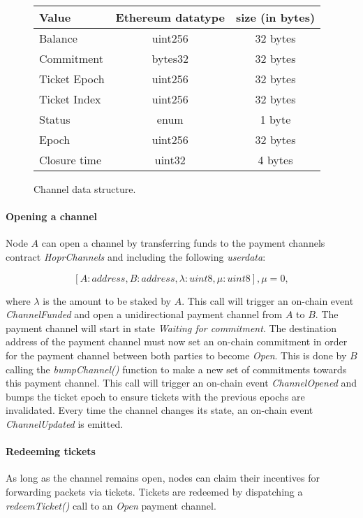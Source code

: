 \begin{figure}[H]
    \centering
    \begin{tabular}{| l | c | c |}
        \hline
        Value        & Ethereum datatype & size (in bytes) \\
        \hline
        \hline
        Balance      & uint256           & 32 bytes        \\
        Commitment   & bytes32           & 32 bytes        \\
        Ticket Epoch & uint256           & 32 bytes        \\
        Ticket Index & uint256           & 32 bytes        \\
        Status       & enum              & 1 byte          \\
        Epoch        & uint256           & 32 bytes        \\
        Closure time & uint32            & 4 bytes         \\
        \hline
    \end{tabular}
    \caption{Channel data structure.}
\end{figure}


\paragraph{Opening a channel} Node $A$ can open a channel by transferring funds to the payment channels contract \textit{HoprChannels} and including the following \textit{userdata}:

$$[A: address, B: address, \lambda: uint8, \mu: uint8], \mu = 0,$$

where $\lambda$ is the amount to be staked by $A$. This call will trigger an on-chain event \textit{ChannelFunded} and open a unidirectional payment channel from $A$ to $B$. The payment channel will start in state \textit{Waiting for commitment}. The destination address of the payment channel must now set an on-chain commitment in order for the payment channel between both parties to become \textit{Open}. This is done by $B$ calling the \textit{bumpChannel()} function to make a new set of commitments towards this payment channel. This call will trigger an on-chain event \textit{ChannelOpened} and bumps the ticket epoch to ensure tickets with the previous epochs are invalidated. Every time the channel changes its state, an on-chain event \textit{ChannelUpdated} is emitted.

\paragraph{Redeeming tickets}
As long as the channel remains open, nodes can claim their incentives for forwarding packets via tickets. Tickets are redeemed by dispatching a \textit{redeemTicket()} call to an \textit{Open} payment channel.

